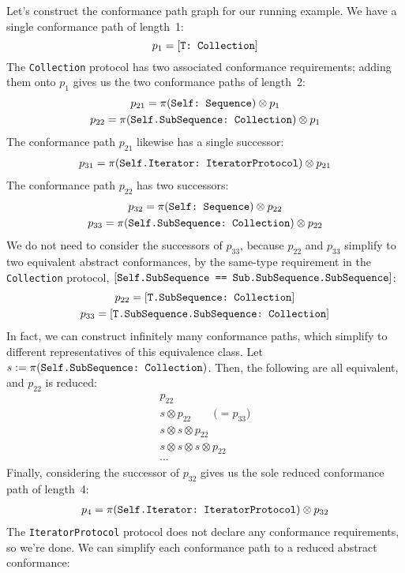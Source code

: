 \documentclass[../generics]{subfiles}
\begin{document}
Let's construct the conformance path graph for our running example. We have a single conformance path of length~1:
\[p_1 = [\texttt{T:~Collection}]\]
The \texttt{Collection} protocol has two associated conformance requirements; adding them onto $p_1$ gives us the two conformance paths of length~2:
\begin{gather*}
p_{21} = \pi(\texttt{Self:~Sequence})\otimes p_1\\
p_{22} = \pi(\texttt{Self.SubSequence:~Collection})\otimes p_1
\end{gather*}
The conformance path $p_{21}$ likewise has a single successor:
\begin{gather*}
p_{31} = \pi(\texttt{Self.Iterator:~IteratorProtocol}) \otimes p_{21}
\end{gather*}
The conformance path $p_{22}$ has two successors:
\begin{gather*}
p_{32} = \pi(\texttt{Self:~Sequence})\otimes p_{22}\\
p_{33} = \pi(\texttt{Self.SubSequence:~Collection})\otimes p_{22}
\end{gather*}
We do not need to consider the successors of $p_{33}$, because $p_{22}$ and $p_{33}$ simplify to two equivalent abstract conformances, by the same-type requirement  in the \texttt{Collection} protocol, $[\texttt{Self.SubSequence == Sub.SubSequence.SubSequence}]$:
\begin{gather*}
p_{22}=[\texttt{T.SubSequence:~Collection}]\\
p_{33}=[\texttt{T.SubSequence.SubSequence:~Collection}]
\end{gather*}
In fact, we can construct infinitely many conformance paths, which simplify to different representatives of this equivalence class. Let $s:=\pi(\texttt{Self.SubSequence:~Collection})$. Then, the following are all equivalent, and $p_{22}$ is reduced:
\begin{gather*}
p_{22}\\
s\otimes p_{22}\qquad\mbox{($= p_{33}$)}\\
s\otimes s\otimes p_{22}\\
s\otimes s\otimes s\otimes p_{22}\\
\cdots
\end{gather*}
Finally, considering the successor of $p_{32}$ gives us the sole reduced conformance path of length~4:
\begin{gather*}
p_4 = \pi(\texttt{Self.Iterator:~IteratorProtocol}) \otimes p_{32}
\end{gather*}
The \texttt{IteratorProtocol} protocol does not declare any conformance requirements, so we're done. We can simplify each conformance path to a reduced abstract conformance:
\end{document}
